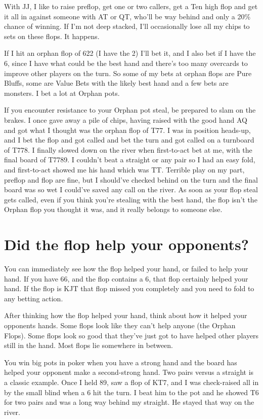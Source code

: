 With JJ, I like to raise preflop, get one or two callers, get a Ten
high flop and get it all in against someone with AT or QT, who'll be
way behind and only a 20\% chance of winning. If I'm not deep stacked,
I'll occasionally lose all my chips to sets on these flops. It happens.

If I hit an orphan flop of 622 (I have the 2) I'll
bet it, and I also bet if I have the 6, since I have
what could be the best hand and there's too many overcards to improve
other players on the turn. So some of my bets at orphan flops are
Pure Bluffs, some are Value Bets with the likely best hand and a few
bets are monsters. I bet a lot at Orphan pots.

If you encounter resistance to your Orphan pot steal, be prepared
to slam on the brakes. I once gave away a pile of chips, having
raised with the good hand AQ and got what I thought was the orphan
flop of T77. I was in position heads-up, and I bet the flop and
got called and bet the turn and got called on a turnboard of T778.
I finally slowed down on the river when first-to-act bet at me,
with the final board of T7789. I couldn't beat a straight or any pair
so I had an easy fold, and first-to-act showed me his hand which was
TT. Terrible play on my part, preflop and flop are fine, but I
should've checked behind on the turn and the final board was so wet
I could've saved any call on the river. As soon as your flop
steal gets called, even if you think you're stealing with the best
hand, the flop isn't the Orphan flop you thought it was, and it
really belongs to someone else.

\section{Did the flop help your opponents?}

You can immediately see how the flop helped your hand, or failed
to help your hand. If you have 66, and the flop contains
a 6, that flop certainly helped your hand. If the flop is KJT that
flop missed you completely and you need to fold to any betting action.

After thinking how the flop helped your hand, think about how
it helped your opponents hands. Some flops look like they can't
help anyone (the Orphan Flops). Some flops look so
good that they've just got to have helped other players still in
the hand. Most flops lie somewhere in between.

You win big pots in poker when you have a strong hand and the board
has helped your opponent make a second-strong hand. Two pairs
versus a straight is a classic example. Once I held 89, saw a flop
of KT7, and I was check-raised all in by the small blind when a 6 hit
the turn. I beat him to the pot and he showed T6 for two pairs and
was a long way behind my straight. He stayed that way on the river.

